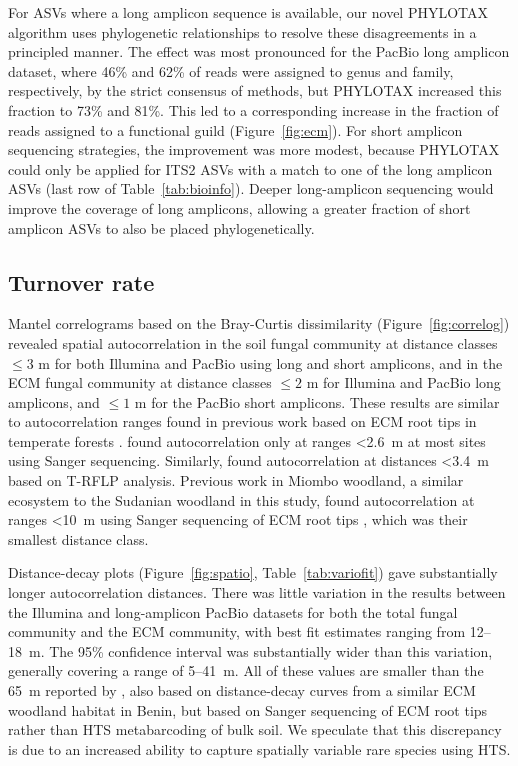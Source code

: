 \documentclass[
  12pt,
]{article}
\begin{document}
For ASVs where a long amplicon sequence is available, our novel PHYLOTAX algorithm uses phylogenetic relationships to resolve these disagreements in a principled manner.
The effect was most pronounced for the PacBio long amplicon dataset,
where 46\% and 62\% of reads were assigned to genus and family, respectively, by the strict consensus of methods, but PHYLOTAX increased this fraction to 73\% and 81\%.
This led to a corresponding increase in the fraction of reads assigned to a functional guild (Figure~\ref{fig:ecm}).
For short amplicon sequencing strategies, the improvement was more modest, because PHYLOTAX could only be applied for ITS2 ASVs with a match to one of the long amplicon ASVs (last row of Table~\ref{tab:bioinfo}).
Deeper long-amplicon sequencing would improve the coverage of long amplicons, allowing a greater fraction of short amplicon ASVs to also be placed phylogenetically.

\hypertarget{turnover-rate}{%
\subsection{Turnover rate}\label{turnover-rate}}

Mantel correlograms based on the Bray-Curtis dissimilarity (Figure~\ref{fig:correlog}) revealed spatial autocorrelation in the soil fungal community at distance classes \(\le 3\) m for both Illumina and PacBio using long and short amplicons, and in the ECM fungal community at distance classes \(\le 2\) m for Illumina and PacBio long amplicons, and \(\le 1\) m for the PacBio short amplicons.
These results are similar to autocorrelation ranges found in previous work based on ECM root tips in temperate forests \autocite{lilleskov2004,pickles2012a}.
\textcite{lilleskov2004} found autocorrelation only at ranges \textless2.6~m at most sites using Sanger sequencing.
Similarly, \textcite{pickles2012a} found autocorrelation at distances \textless3.4~m based on T-RFLP analysis.
Previous work in Miombo woodland, a similar ecosystem to the Sudanian woodland in this study, found autocorrelation at ranges \textless10~m using Sanger sequencing of ECM root tips \autocite{tedersoo2011}, which was their smallest distance class.

Distance-decay plots (Figure~\ref{fig:spatio}, Table~\ref{tab:variofit}) gave substantially longer autocorrelation distances.
There was little variation in the results between the Illumina and long-amplicon PacBio datasets for both the total fungal community and the ECM community, with best fit estimates ranging from 12--18~m.
The 95\% confidence interval was substantially wider than this variation, generally covering a range of 5--41~m.
All of these values are smaller than the 65~m reported by \textcite{Bahram2013}, also based on distance-decay curves from a similar ECM woodland habitat in Benin, but based on Sanger sequencing of ECM root tips rather than HTS metabarcoding of bulk soil.
We speculate that this discrepancy is due to an increased ability to capture spatially variable rare species using HTS.
\end{document}
